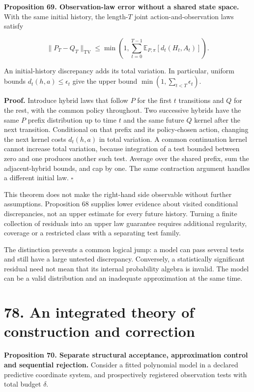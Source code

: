 \documentclass[11pt,letterpaper]{article}
\begin{document}
\textbf{Proposition 69. Observation-law error without a shared state
space.} With the same initial history, the length-\(T\) joint
action-and-observation laws satisfy

\[
\boxed{
\|P_T-Q_T\|_{\mathrm{TV}}
\leq\min\left(1,\sum_{t=0}^{T-1}
\mathbb E_{P,\pi}[d_t(H_t,A_t)]\right).
}
\]

An initial-history discrepancy adds its total variation. In particular,
uniform bounds \(d_t(h,a)\leq\epsilon_t\) give the upper bound
\(\min(1,\sum_{t<T}\epsilon_t)\).

\textbf{Proof.} Introduce hybrid laws that follow \(P\) for the first
\(t\) transitions and \(Q\) for the rest, with the common policy
throughout. Two successive hybrids have the same \(P\) prefix
distribution up to time \(t\) and the same future \(Q\) kernel after the
next transition. Conditional on that prefix and its policy-chosen
action, changing the next kernel costs \(d_t(h,a)\) in total variation.
A common continuation kernel cannot increase total variation, because
integration of a test bounded between zero and one produces another such
test. Average over the shared prefix, sum the adjacent-hybrid bounds,
and cap by one. The same contraction argument handles a different
initial law. \(\square\)

This theorem does not make the right-hand side observable without
further assumptions. Proposition 68 supplies lower evidence about
visited conditional discrepancies, not an upper estimate for every
future history. Turning a finite collection of residuals into an upper
law guarantee requires additional regularity, coverage or a restricted
class with a separating test family.

The distinction prevents a common logical jump: a model can pass several
tests and still have a large untested discrepancy. Conversely, a
statistically significant residual need not mean that its internal
probability algebra is invalid. The model can be a valid distribution
and an inadequate approximation at the same time.

\section{78. An integrated theory of construction and
correction}\label{an-integrated-theory-of-construction-and-correction}

\textbf{Proposition 70. Separate structural acceptance, approximation
control and sequential rejection.} Consider a fitted polynomial model in
a declared predictive coordinate system, and prospectively registered
observation tests with total budget \(\delta\).
\end{document}
